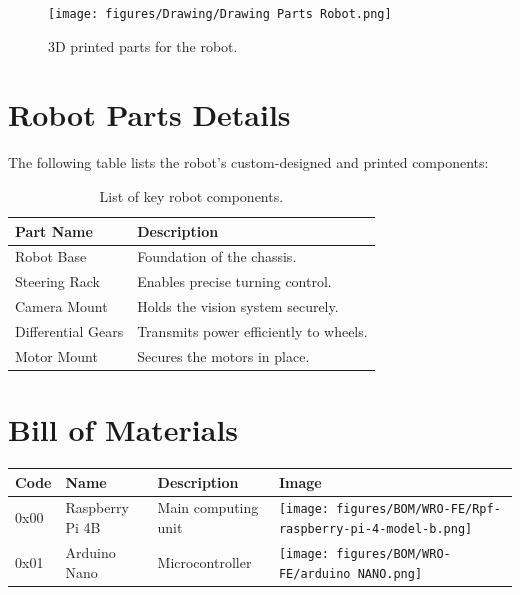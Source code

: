 \documentclass[12pt,a4paper]{article}
\begin{document}
\begin{figure}[ht]
    \centering
    \texttt{[image: figures/Drawing/Drawing Parts Robot.png]}
    \caption{3D printed parts for the robot.}
    \label{fig:printed_parts}
\end{figure}

\section{Robot Parts Details}
The following table lists the robot's custom-designed and printed components:

\begin{table}
    \centering
    \begin{tabular}{|l|l|}
        \hline
        \textbf{Part Name} & \textbf{Description} \\ \hline
        Robot Base & Foundation of the chassis. \\ \hline
        Steering Rack & Enables precise turning control. \\ \hline
        Camera Mount & Holds the vision system securely. \\ \hline
        Differential Gears & Transmits power efficiently to wheels. \\ \hline
        Motor Mount & Secures the motors in place. \\ \hline
    \end{tabular}
    \caption{List of key robot components.}
    \label{tab:robot_parts}
\end{table}



\newpage


\section*{Bill of Materials}

\renewcommand{\arraystretch}{1.5} %

\setlength{\extrarowheight}{2pt}  %

\begin{tabularx}{\textwidth}{|l|X|X|X|}
\hline
\textbf{Code} & \textbf{Name} & \textbf{Description} & \textbf{Image} \\
\hline
0x00 & Raspberry Pi 4B & Main computing unit & 
\texttt{[image: figures/BOM/WRO-FE/Rpf-raspberry-pi-4-model-b.png]} \\
\hline
0x01 & Arduino Nano & Microcontroller & 
\texttt{[image: figures/BOM/WRO-FE/arduino NANO.png]} \\
\hline

\end{tabularx}
\end{document}
